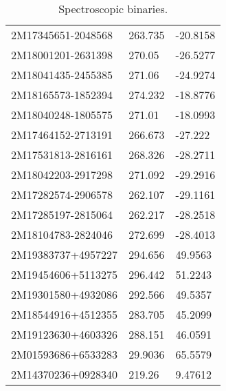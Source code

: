 \documentclass[fleqn,usenatbib]{mnras}
\begin{document}
\begin{table}
\begin{tabular}{lll}
2M17345651-2048568 &  263.735 &  -20.8158 \\
2M18001201-2631398 &   270.05 &  -26.5277 \\
2M18041435-2455385 &   271.06 &  -24.9274 \\
2M18165573-1852394 &  274.232 &  -18.8776 \\
2M18040248-1805575 &   271.01 &  -18.0993 \\
2M17464152-2713191 &  266.673 &   -27.222 \\
2M17531813-2816161 &  268.326 &  -28.2711 \\
2M18042203-2917298 &  271.092 &  -29.2916 \\
2M17282574-2906578 &  262.107 &  -29.1161 \\
2M17285197-2815064 &  262.217 &  -28.2518 \\
2M18104783-2824046 &  272.699 &  -28.4013 \\
2M19383737+4957227 &  294.656 &   49.9563 \\
2M19454606+5113275 &  296.442 &   51.2243 \\
2M19301580+4932086 &  292.566 &   49.5357 \\
2M18544916+4512355 &  283.705 &   45.2099 \\
2M19123630+4603326 &  288.151 &   46.0591 \\
2M01593686+6533283 &  29.9036 &   65.5579 \\
2M14370236+0928340 &   219.26 &   9.47612 \\
  \bottomrule
  \end{tabular}
  \caption{Spectroscopic binaries.}
  \label{tab:binaries}
\end{table}
\end{document}
